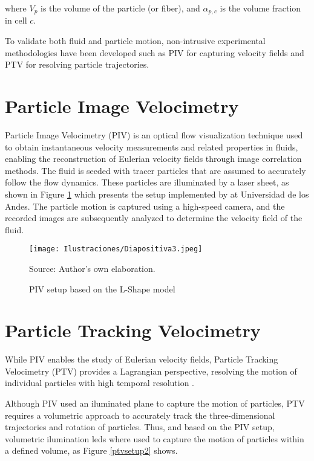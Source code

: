where $V_p$ is the volume of the particle (or fiber), and $\alpha_{p,c}$ is the volume fraction in cell $c$.

To validate both fluid and particle motion, non-intrusive experimental methodologies have been developed such as PIV for capturing velocity fields and PTV for resolving particle trajectories.

\section{Particle Image Velocimetry}

Particle Image Velocimetry (PIV) is an optical flow visualization technique used to obtain instantaneous velocity measurements and related properties in fluids, enabling the reconstruction of Eulerian velocity fields \cite{raffel2018particle} through image correlation methods. The fluid is seeded with tracer particles that are assumed to accurately follow the flow dynamics. These particles are illuminated by a laser sheet, as shown in Figure \ref{pivsetup} which presents the setup implemented by \cite{maggi2023} at Universidad de los Andes. The particle motion is captured using a high-speed camera, and the recorded images are subsequently analyzed to determine the velocity field of the fluid.

\begin{figure}[htb]
    \centering
    \texttt{[image: Ilustraciones/Diapositiva3.jpeg]}
    \caption{PIV setup based on the L-Shape model}
    Source: Author's own elaboration.
    \label{pivsetup}
\end{figure}

\section{Particle Tracking Velocimetry}

While PIV enables the study of Eulerian velocity fields, Particle Tracking Velocimetry (PTV) provides a Lagrangian perspective, resolving the motion of individual particles with high temporal resolution \cite{maas1993particle}.

Although PIV used an iluminated plane to capture the motion of particles, PTV requires a volumetric approach to accurately track the three-dimensional trajectories and rotation of particles. Thus, and based on the PIV setup, volumetric ilumination leds where used to capture the motion of particles within a defined volume, as Figure \ref{ptvsetup2} shows.

